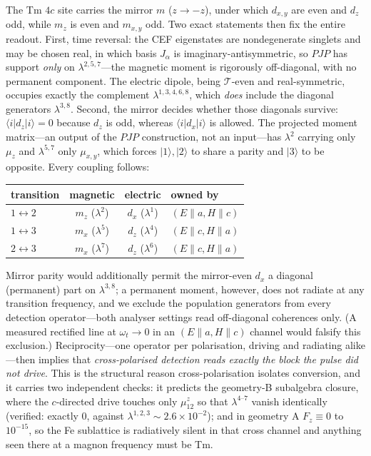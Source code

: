 \documentclass[aps,prb,twocolumn,superscriptaddress,longbibliography]{revtex4-2}
\newcommand{\ket}[1]{|#1\rangle}
\newcommand{\bra}[1]{\langle #1|}
\begin{document}
The Tm $4c$ site carries the mirror $m$ ($z\to-z$), under which
$d_{x,y}$ are even and $d_z$ odd, while $m_z$ is even and $m_{x,y}$ odd.
Two exact statements then fix the entire readout.  First, time reversal:
the CEF eigenstates are nondegenerate singlets and may be chosen real, in
which basis $J_\alpha$ is imaginary-antisymmetric, so $PJP$ has support
\emph{only} on $\lambda^{2,5,7}$---the magnetic moment is rigorously
off-diagonal, with no permanent component.  The electric dipole, being
$\mathcal T$-even and real-symmetric, occupies exactly the complement
$\lambda^{1,3,4,6,8}$, which \emph{does} include the diagonal generators
$\lambda^{3,8}$.  Second, the mirror decides whether those diagonals
survive: $\bra id_z\ket i=0$ because $d_z$ is odd, whereas
$\bra id_x\ket i$ is allowed.  The projected moment matrix---an output of
the $PJP$ construction, not an input---has $\lambda^2$ carrying only
$\mu_z$ and $\lambda^{5,7}$ only $\mu_{x,y}$, which forces $\ket1,\ket2$
to share a parity and $\ket3$ to be opposite.  Every coupling follows:
\begin{center}\small
\renewcommand{\arraystretch}{1.25}
\begin{tabular}{lccl}
\hline
transition & magnetic & electric & owned by\\
\hline
$1\!\leftrightarrow\!2$ & $m_z$ ($\lambda^2$) & $d_{x}$ ($\lambda^1$) &
  $(E\!\parallel\!a,H\!\parallel\!c)$\\
$1\!\leftrightarrow\!3$ & $m_{x}$ ($\lambda^5$) & $d_z$ ($\lambda^4$) &
  $(E\!\parallel\!c,H\!\parallel\!a)$\\
$2\!\leftrightarrow\!3$ & $m_{x}$ ($\lambda^7$) & $d_z$ ($\lambda^6$) &
  $(E\!\parallel\!c,H\!\parallel\!a)$\\
\hline
\end{tabular}
\end{center}
Mirror parity would additionally permit the mirror-even $d_x$ a
diagonal (permanent) part on $\lambda^{3,8}$; a permanent moment,
however, does not radiate at any transition frequency, and we exclude
the population generators from every detection operator---both analyser
settings read off-diagonal coherences only.  (A measured rectified line
at $\omega_t\!\to\!0$ in an $(E\!\parallel\!a,H\!\parallel\!c)$ channel
would falsify this exclusion.)
Reciprocity---one operator per polarisation, driving and radiating
alike---then implies that \emph{cross-polarised detection reads exactly
the block the pulse did not drive}.  This is the structural reason
cross-polarisation isolates conversion, and it carries two independent
checks: it predicts the geometry-B subalgebra closure, where the
$c$-directed drive touches only $\mu^z_{12}$ so that
$\lambda^{4\text{--}7}$ vanish identically (verified: exactly $0$,
against $\lambda^{1,2,3}\sim2.6\times10^{-2}$); and in geometry A
$F_z\equiv0$ to $10^{-15}$, so the Fe sublattice is radiatively silent
in that cross channel and anything seen there at a magnon frequency must
be Tm.
\end{document}
